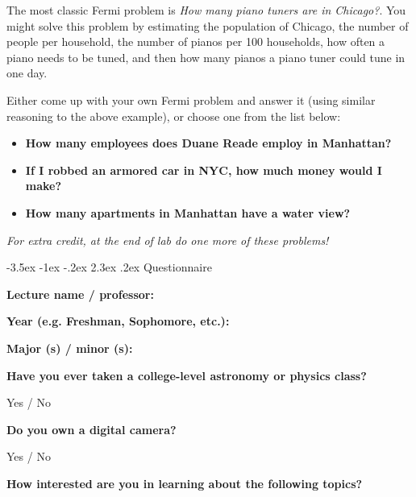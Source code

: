 \documentclass[12pt]{article}
\makeatletter
\renewcommand\section{\@startsection{section}{1}{\z@}%
                                  {-3.5ex \@plus -1ex \@minus -.2ex}%
                                  {2.3ex \@plus.2ex}%
                                  {\normalfont\large\bfseries}}
\makeatother
\begin{document}
The most classic Fermi problem is \emph{How many piano tuners are in Chicago?}. You might solve this problem by estimating the population of Chicago, the number of people per household, the number of pianos per 100 households, how often a piano needs to be tuned, and then how many pianos a piano tuner could tune in one day. 

Either come up with your own Fermi problem and answer it (using similar reasoning to the above example), or choose one from the list below:

\begin{itemize}
	\item \textbf{How many employees does Duane Reade employ in Manhattan?}
	\item \textbf{If I robbed an armored car in NYC, how much money would I make?}
	\item \textbf{How many apartments in Manhattan have a water view?}
\end{itemize}

\emph{For extra credit, at the end of lab do one more of these problems!}

\clearpage

\section{Questionnaire}

\noindent\textbf{Lecture name / professor:}

\vspace{0.2in}

\noindent\textbf{Year (e.g. Freshman, Sophomore, etc.):}

\vspace{0.2in}

\noindent\textbf{Major (s) / minor (s):}

\vspace{0.2in}

\noindent\textbf{Have you ever taken a college-level astronomy or physics class?}

\vspace{0.1in}
Yes / No

\vspace{0.2in}
\noindent\textbf{Do you own a digital camera?}

\vspace{0.1in}
Yes / No

\vspace{0.2in}
\noindent\textbf{How interested are you in learning about the following topics?}
\end{document}
